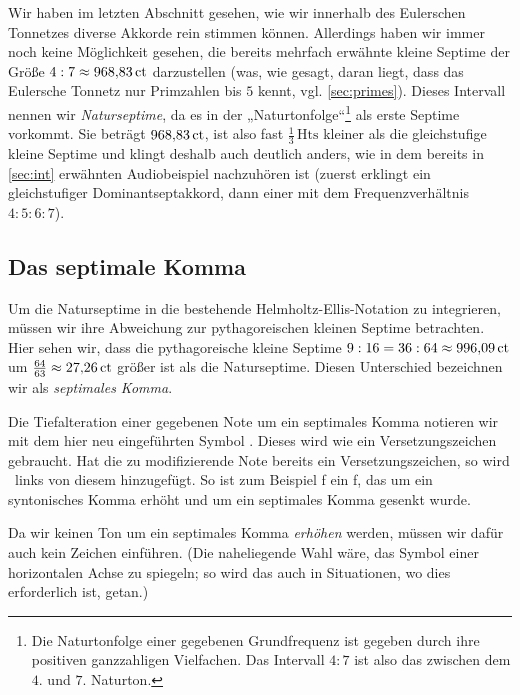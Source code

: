 Wir haben im letzten Abschnitt gesehen, wie wir innerhalb des Eulerschen
Tonnetzes diverse Akkorde rein stimmen können.  Allerdings haben wir immer noch
keine Möglichkeit gesehen, die bereits mehrfach erwähnte kleine Septime der
Größe $4:7\approx 968{,}83\,\mathrm{ct}$ darzustellen (was, wie gesagt, daran liegt,
dass das Eulersche Tonnetz nur Primzahlen bis $5$ kennt,
vgl. \cref{sec:primes}). Dieses Intervall nennen wir \emph{Naturseptime}, da es
in der „Naturtonfolge“\footnote{Die Naturtonfolge einer gegebenen Grundfrequenz
  ist gegeben durch ihre positiven ganzzahligen Vielfachen. Das Intervall $4:7$
  ist also das zwischen dem $4$. und $7$. Naturton.} als erste Septime vorkommt.
Sie beträgt $968{,}83\,\mathrm{ct}$, ist also fast $\frac13\,\text{Hts}$ kleiner als
die gleichstufige kleine Septime und klingt deshalb auch deutlich anders, wie in
dem bereits in \cref{sec:int} erwähnten Audiobeispiel nachzuhören ist
(zuerst erklingt ein gleichstufiger Dominantseptakkord, dann einer mit dem
Frequenzverhältnis $4:5:6:7$).

\subsection{Das septimale Komma}

Um die Naturseptime in die bestehende Helmholtz-Ellis-Notation zu integrieren,
müssen wir ihre Abweichung zur pythagoreischen kleinen Septime betrachten.  Hier
sehen wir, dass die pythagoreische kleine Septime
$9:16=36:64\approx 996{,}09\,\mathrm{ct}$ um $\frac{64}{63}\approx 27{,}26\,\mathrm{ct}$
größer ist als die Naturseptime. Diesen Unterschied bezeichnen wir als
\emph{septimales Komma}.

Die Tiefalteration einer gegebenen Note um ein septimales Komma notieren wir mit
dem hier neu eingeführten Symbol \septimal.  Dieses wird wie ein
Versetzungszeichen gebraucht. Hat die zu modifizierende Note bereits ein
Versetzungszeichen, so wird \septimal\ links von diesem hinzugefügt. So ist zum
Beispiel \septimal\naturalp f ein f, das um ein syntonisches Komma erhöht und um
ein septimales Komma gesenkt wurde.

Da wir keinen Ton um ein septimales Komma \emph{erhöhen} werden, müssen wir
dafür auch kein Zeichen einführen. (Die naheliegende Wahl wäre, das Symbol einer
horizontalen Achse zu spiegeln; so wird das auch in Situationen, wo dies
erforderlich ist, getan.)

